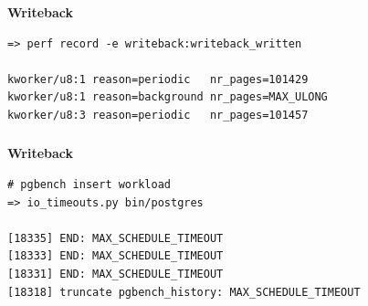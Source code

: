 \documentclass[usenames,dvipsnames, 18pt, compress, aspectratio=169]{beamer}
\begin{document}
\begin{frame}[fragile]{}
    \frametitle{}
    \begin{center}
        \textbf{Writeback}

        \begin{flushleft}
		\begin{verbatim}
=> perf record -e writeback:writeback_written

kworker/u8:1 reason=periodic   nr_pages=101429
kworker/u8:1 reason=background nr_pages=MAX_ULONG
kworker/u8:3 reason=periodic   nr_pages=101457
        \end{verbatim}
        \end{flushleft}

    \end{center}
\end{frame}

\begin{frame}[fragile]{}
    \frametitle{}
    \begin{center}
        \textbf{Writeback}

        \begin{flushleft}
		\begin{verbatim}
# pgbench insert workload
=> io_timeouts.py bin/postgres

[18335] END: MAX_SCHEDULE_TIMEOUT
[18333] END: MAX_SCHEDULE_TIMEOUT
[18331] END: MAX_SCHEDULE_TIMEOUT
[18318] truncate pgbench_history: MAX_SCHEDULE_TIMEOUT
        \end{verbatim}
        \end{flushleft}

    \end{center}
\end{frame}
\end{document}
